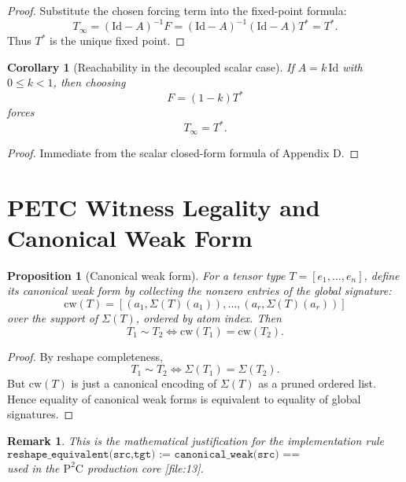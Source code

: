 \documentclass[11pt,a4paper]{article}
\newtheorem{corollary}[theorem]{Corollary}
\newtheorem{proposition}[theorem]{Proposition}
\newtheorem{remark}[theorem]{Remark}
\begin{document}
\begin{proof}
Substitute the chosen forcing term into the fixed-point formula:
\[
T_\infty
=
(\mathrm{Id}-A)^{-1}F
=
(\mathrm{Id}-A)^{-1}(\mathrm{Id}-A)T^*
=
T^*.
\]
Thus \(T^*\) is the unique fixed point.
\end{proof}

\begin{corollary}[Reachability in the decoupled scalar case]
If \(A=k\,\mathrm{Id}\) with \(0\le k<1\), then choosing
\[
F=(1-k)T^*
\]
forces
\[
T_\infty=T^*.
\]
\end{corollary}

\begin{proof}
Immediate from the scalar closed-form formula of Appendix D.
\end{proof}

\section{PETC Witness Legality and Canonical Weak Form}

\begin{proposition}[Canonical weak form]
For a tensor type \(T=[e_1,\dots,e_n]\), define its canonical weak form by collecting the nonzero entries of the global signature:
\[
\mathrm{cw}(T)
=
[(a_1,\Sigma(T)(a_1)),\dots,(a_r,\Sigma(T)(a_r))]
\]
over the support of \(\Sigma(T)\), ordered by atom index. Then
\[
T_1 \sim T_2 \iff \mathrm{cw}(T_1)=\mathrm{cw}(T_2).
\]
\end{proposition}

\begin{proof}
By reshape completeness,
\[
T_1\sim T_2 \iff \Sigma(T_1)=\Sigma(T_2).
\]
But \(\mathrm{cw}(T)\) is just a canonical encoding of \(\Sigma(T)\) as a pruned ordered list. Hence equality of canonical weak forms is equivalent to equality of global signatures.
\end{proof}

\begin{remark}
This is the mathematical justification for the implementation rule
\[
\texttt{reshape\_equivalent(src,tgt) := canonical\_weak(src) == canonical\_weak(tgt)}
\]
used in the \(\mathrm{P}^2\mathrm{C}\) production core [file:13].
\end{remark}

\nocite{*}


\end{document}
